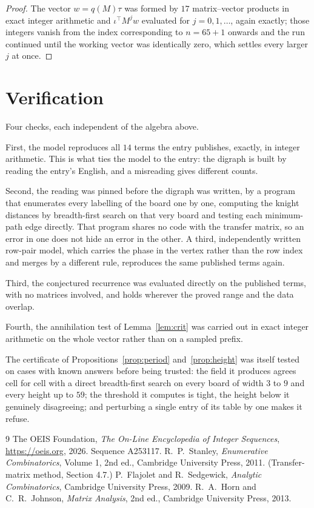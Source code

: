 \documentclass[11pt,a4paper]{article}
\theoremstyle{plain}
\theoremstyle{definition}
\begin{document}
\begin{proof}
The vector $w=q(M)\tau$ was formed by $17$ matrix--vector products in exact integer
arithmetic and $\iota^{\!\top}M^{j}w$ evaluated for $j=0,1,\dots$, again exactly; those
integers vanish from the index corresponding to $n=65+1$ onwards and the run continued
until the working vector was identically zero, which settles every larger $j$ at once.
\end{proof}

\section{Verification}

Four checks, each independent of the algebra above.

First, the model reproduces all $14$ terms the entry publishes, exactly, in integer
arithmetic. This is what ties the model to the entry: the digraph is built by reading the
entry's English, and a misreading gives different counts.

Second, the reading was pinned before the digraph was written, by a program that enumerates
every labelling of the board one by one, computing the knight distances by breadth-first
search on that very board and testing each minimum-path edge directly. That program shares no
code with the transfer matrix, so an error in one does not hide an error in the other. A
third, independently written row-pair model, which carries the phase in the vertex rather than
the row index and merges by a different rule, reproduces the same published terms again.

Third, the conjectured recurrence was evaluated directly on the published terms, with no
matrices involved, and holds wherever the proved range and the data overlap.

Fourth, the annihilation test of Lemma~\ref{lem:crit} was carried out in exact integer
arithmetic on the whole vector rather than on a sampled prefix.

The certificate of Propositions~\ref{prop:period} and~\ref{prop:height} was itself tested
on cases with known answers before being trusted: the field it produces agrees cell for cell
with a direct breadth-first search on every board of width $3$ to $9$ and every height up to
$59$; the threshold it computes is tight, the height below it genuinely disagreeing; and
perturbing a single entry of its table by one makes it refuse.

\begin{thebibliography}{9}
 The OEIS Foundation, \emph{The On-Line Encyclopedia of Integer
Sequences}, \url{https://oeis.org}, 2026. Sequence A253117.
 R.~P.~Stanley, \emph{Enumerative Combinatorics}, Volume 1, 2nd ed.,
Cambridge University Press, 2011. (Transfer-matrix method, Section 4.7.)
 P.~Flajolet and R.~Sedgewick, \emph{Analytic Combinatorics}, Cambridge
University Press, 2009.
 R.~A.~Horn and C.~R.~Johnson, \emph{Matrix Analysis}, 2nd ed., Cambridge
University Press, 2013.
\end{thebibliography}
\end{document}
